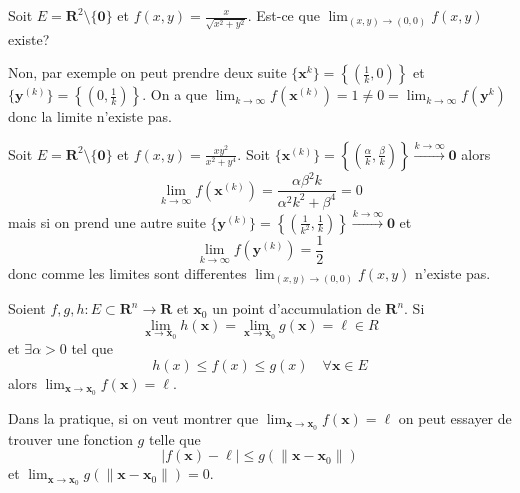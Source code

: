 \begin{example}
Soit $E=\mathbf{R}^{2}\setminus \{ \boldsymbol{0} \}$ et $f(x,y)=\frac{x}{\sqrt{ x^{2}+y^{2} }}$. Est-ce que $\lim_{ (x,y) \to (0,0) }f(x,y)$ existe? 

Non, par exemple on peut prendre deux suite $\{ \boldsymbol{x}^{k} \}=\left\{  \left( \frac{1}{k},0 \right)  \right\}$ et $\{ \boldsymbol{y}^{(k)} \}=\left\{  \left( 0, \frac{1}{k} \right)  \right\}$. On a que $\lim_{ k \to \infty }f(\boldsymbol{x}^{(k)})=1\neq 0=\lim_{ k \to \infty }f(\boldsymbol{y}^{k})$ donc la limite n'existe pas.
\end{example}
\begin{example}
Soit $E=\mathbf{R}^{2}\setminus \{ \boldsymbol{0} \}$ et $f(x,y)=\frac{xy^{2}}{ x^{2}+y^{4} }$. Soit $\{ \boldsymbol{x}^{(k)} \}=\left\{  \left( \frac{\alpha}{k}, \frac{\beta}{k} \right)  \right\}\overset{k\to \infty}\to \boldsymbol{0}$ alors $$\lim_{ k \to \infty }f(\boldsymbol{x}^{(k)})=\frac{\alpha\beta^{2}k}{\alpha^{2}k^{2}+\beta^{4}}=0$$
mais si on prend une autre suite $\{ \boldsymbol{y}^{(k)} \}=\left\{  \left( \frac{1}{k^{2}}, \frac{1}{k} \right)  \right\}\overset{k\to \infty}\to \boldsymbol{0}$ et
$$
\lim_{ k \to \infty } f(\boldsymbol{y}^{(k)})=\frac{1}{2}
$$
donc comme les limites sont differentes $\lim_{ (x,y) \to (0,0) }f(x,y)$ n'existe pas.
\end{example}

\begin{theorem}
Soient $f,g,h:E\subset \mathbf{R}^{n}\to \mathbf{R}$ et $\boldsymbol{x}_{0}$ un point d'accumulation de $\mathbf{R}^{n}$. Si
$$
\lim_{ \boldsymbol{x} \to \boldsymbol{x}_{0} }h(\boldsymbol{x})=\lim_{ \boldsymbol{x} \to \boldsymbol{x}_{0} } g(\boldsymbol{x})=\ell \in R 
$$
et $\exists\alpha>0$ tel que 
$$
h(x)\leq f(x)\le g(x)\quad\forall \boldsymbol{x}\in E
$$
alors $\lim_{ \boldsymbol{x} \to \boldsymbol{x}_{0} }f(\boldsymbol{x})=\ell$.
\end{theorem}
\begin{remark}
Dans la pratique, si on veut montrer que $\lim_{ \boldsymbol{x} \to \boldsymbol{x}_{0} }f(\boldsymbol{x})=\ell$ on peut essayer de trouver une fonction $g$ telle que
$$
|f(\boldsymbol{x})-\ell |\le g(\lVert \boldsymbol{x}-\boldsymbol{x}_{0} \rVert )
$$
et $\lim_{ \boldsymbol{x} \to \boldsymbol{x}_{0} }g(\lVert \boldsymbol{x}-\boldsymbol{x}_{0} \rVert)=0$.
\end{remark}